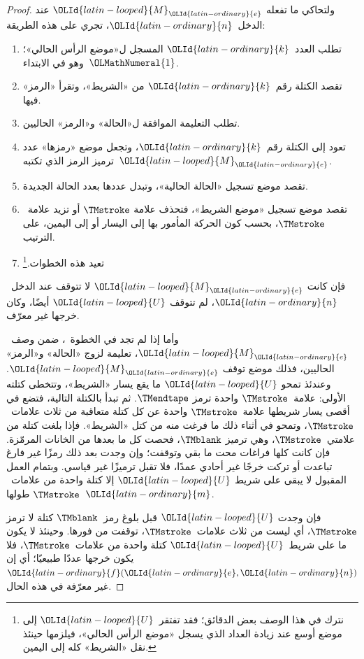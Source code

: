 \documentclass[../../../include/open-logic-section]{subfiles}
\begin{document}
\begin{proof}
  ولتحاكي ما تفعله $\OLId{latin-looped}{M}_\OLId{latin-ordinary}{e}$ عند الدخل~$\OLId{latin-ordinary}{n}$، تجري على هذه الطريقة:
  \begin{enumerate}
    \item تطلب العدد~$\OLId{latin-ordinary}{k}$ المسجل ل«موضع الرأس الحالي»؛ وهو في
    الابتداء~$\OLMathNumeral{1}$.
    \item تقصد الكتلة رقم~$\OLId{latin-ordinary}{k}$ من «الشريط»، وتقرأ «الرمز» فيها.
    \item{}%
    تطلب التعليمة الموافقة ل«الحالة» و«الرمز» الحاليين.
    \item تعود إلى الكتلة رقم~$\OLId{latin-ordinary}{k}$، وتجعل موضع «رمزها» عدد ترميز
    الرمز الذي تكتبه~$\OLId{latin-looped}{M}_\OLId{latin-ordinary}{e}$.
    \item تقصد موضع تسجيل «الحالة الحالية»، وتبدل عددها بعدد
    الحالة الجديدة.
    \item تقصد موضع تسجيل «موضع الشريط»، فتحذف علامة
    $\TMstroke$ أو تزيد علامة~$\TMstroke$، بحسب كون الحركة
    المأمور بها إلى اليسار أو إلى اليمين، على الترتيب.
    \item تعيد هذه الخطوات.\footnote{نترك في هذا الوصف بعض
    الدقائق؛ فقد تفتقر~$\OLId{latin-looped}{U}$ إلى موضع أوسع عند زيادة العداد الذي
    يسجل «موضع الرأس الحالي»، فيلزمها حينئذ نقل «الشريط» كله
    إلى اليمين.}
  \end{enumerate}
  فإن كانت $\OLId{latin-looped}{M}_\OLId{latin-ordinary}{e}$ لا تتوقف عند الدخل~$\OLId{latin-ordinary}{n}$، لم تتوقف $\OLId{latin-looped}{U}$ أيضًا،
  وكان خرجها غير معرّف.

  وأما إذا لم تجد في الخطوة~، ضمن وصف~$\OLId{latin-looped}{M}_\OLId{latin-ordinary}{e}$،
  تعليمة لزوج «الحالة» و«الرمز» الحاليين، فذلك موضع توقف $\OLId{latin-looped}{M}_\OLId{latin-ordinary}{e}$.
  وعندئذ تمحو $\OLId{latin-looped}{U}$ ما يقع يسار «الشريط»، وتتخطى كتلته الأولى:
  علامة~$\TMstroke$ واحدة ترمز $\TMendtape$. ثم تبدأ بالكتلة
  التالية، فتضع في أقصى يسار شريطها علامة~$\TMstroke$ واحدة
  عن كل كتلة متعاقبة من ثلاث علامات~$\TMstroke$، وتمحو في أثناء
  ذلك ما فرغت منه من كتل «الشريط». فإذا بلغت كتلة من
  علامتي~$\TMstroke$، وهي ترميز $\TMblank$، فحصت كل ما بعدها من
  الخانات المرمّزة. فإن كانت كلها فراغات محت ما بقي وتوقفت؛ وإن
  وجدت بعد ذلك رمزًا غير فارغ تباعدت أو تركت خرجًا غير أحادي عمدًا،
  فلا تقبل ترميزًا غير قياسي. وبتمام العمل المقبول لا يبقى على شريط
  $\OLId{latin-looped}{U}$ إلا كتلة واحدة من علامات~$\TMstroke$ طولها~$\OLId{latin-ordinary}{m}$.


  فإن وجدت $\OLId{latin-looped}{U}$ قبل بلوغ رمز~$\TMblank$ كتلة لا ترمز
  $\TMstroke$، أي ليست من ثلاث علامات~$\TMstroke$، توقفت من
  فورها. وحينئذ لا يكون ما على شريط~$\OLId{latin-looped}{U}$ كتلة واحدة من
  علامات~$\TMstroke$، فلا يكون خرجها عددًا طبيعيًا؛ أي إن
  $\OLId{latin-ordinary}{f}(\OLId{latin-ordinary}{e},\OLId{latin-ordinary}{n})$ غير معرّفة في هذه الحال.
\end{proof}
\end{document}

